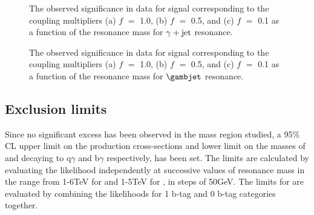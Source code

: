 \begin{figure}[htbp]
\begin{center}
 \caption{The observed significance in data for \qstar signal corresponding to the coupling multipliers (a) $f$ $=$ 1.0, (b) $f$ $=$ 0.5, and (c) $f$ $=$ 0.1 as a function 
of the resonance mass for $\gamma+\mathrm{jet}$ resonance.}
\label{fig:sig_q}
\end{center}
\end{figure}
\vspace{-0.3in}
\begin{figure}[htbp]
\begin{center}
 \caption{The observed significance in data for \bstar signal corresponding to the coupling multipliers (a) $f$ $=$ 1.0, (b) $f$ $=$ 0.5, and (c) $f$ $=$ 0.1 as a function 
   of the resonance mass for $\gambjet$ resonance.}
\label{fig:sig_b}
\end{center}
\end{figure}
\vspace{-0.3in}


\subsection{Exclusion limits}
Since no significant excess has been observed in the mass region studied, a 95$\%$ CL upper limit on the production cross-sections and lower limit on the masses of
\qstar and \bstar decaying to q$\gamma$ and b$\gamma$ respectively, has been set. The limits are calculated by evaluating the likelihood independently at successive
values of resonance mass in the range from 1-6\unit{TeV} for \qstar and 1-5\unit{TeV} for \bstar, in steps of 50\unit{GeV}. The limits for \bstar
are evaluated by combining the likelihoods for 1 b-tag and 0 b-tag categories together.

